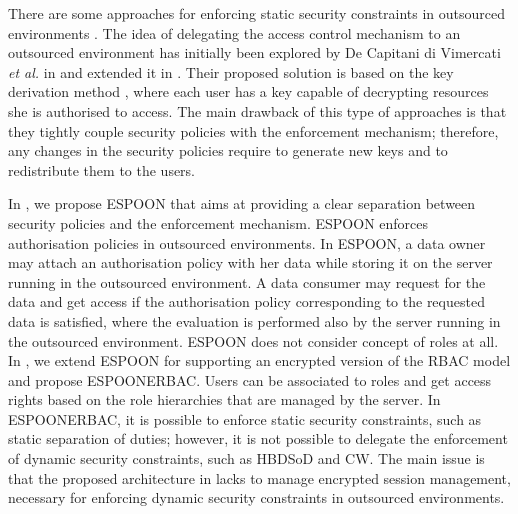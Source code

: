 \documentclass[epsfig,a4paper,11pt,titlepage]{book}
\numberwithin{algorithm}{chapter}
\begin{document}
There are some approaches for enforcing static security constraints in outsourced environments \cite{Asghar2013-COSE, Asghar2011-CCS, Asghar2011-ARES, Vimercati:2010, Vimercati:2007:VLDB}. The idea of delegating the access control mechanism to an outsourced environment has initially been explored by De Capitani di Vimercati \emph{et al.} in \cite{Vimercati:2007:VLDB} and extended it in \cite{Vimercati:2010}. Their proposed solution is based on the key derivation method \cite{Atallah:2009}, where each user has a key capable of decrypting resources she is authorised to access. The main drawback of this type of approaches is that they tightly couple security policies with the enforcement mechanism; therefore, any changes in the security policies require to generate new keys and to redistribute them to the users. 

In \cite{Asghar2011-ARES}, we propose \gls{ESPOON} that aims at providing a clear separation between security policies and the enforcement mechanism. \gls{ESPOON} enforces authorisation policies in outsourced environments. In \gls{ESPOON}, a data owner may attach an authorisation policy with her data while storing it on the server running in the outsourced environment. A data consumer may request for the data and get access if the authorisation policy corresponding to the requested data is satisfied, where the evaluation is performed also by the server running in the outsourced environment. \gls{ESPOON} does not consider concept of roles at all. In \cite{Asghar2013-COSE, Asghar2011-CCS}, we extend \gls{ESPOON} for supporting an encrypted version of the \gls{RBAC} model and propose \gls{ESPOONERBAC}. Users can be associated to roles and get access rights based on the role hierarchies that are managed by the server. In \gls{ESPOONERBAC}, it is possible to enforce static security constraints, such as static separation of duties; however, it is not possible to delegate the enforcement of dynamic security constraints, such as \gls{HBDSoD} and \gls{CW}. The main issue is that the proposed architecture in \cite{Asghar2013-COSE, Asghar2011-CCS} lacks to manage encrypted session management, necessary for enforcing dynamic security constraints in outsourced environments.
\end{document}
